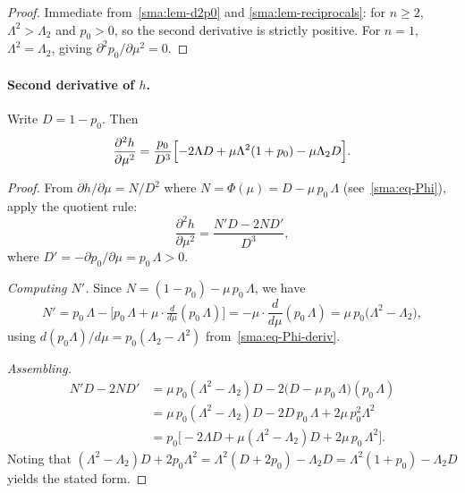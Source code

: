 \begin{proof}
  Immediate from~\cref{sma:lem-d2p0} and
  \cref{sma:lem-reciprocals}: for $n \ge 2$,
  $\Lambda^2 > \Lambda_2$ and $p_0 > 0$, so the second derivative is
  strictly positive. For $n = 1$, $\Lambda^2 = \Lambda_2$, giving
  $\partial^2 p_0/\partial\mu^2 = 0$.
\end{proof}


\paragraph{Second derivative of $h$.}

\begin{proposition}\label{sma:prop-d2h}
  Write $D = 1 - p_0$. Then
  \begin{equation}\label{sma:eq-d2h}
    \frac{\partial^2 h}{\partial\mu^2}
    = \frac{p_0}{D^3}
      \Bigl[-2\Lambda D
            + \mu\Lambda^2(1+p_0)
            - \mu\Lambda_2 D\Bigr].
  \end{equation}
\end{proposition}

\begin{proof}
  From $\partial h/\partial\mu = N/D^2$ where
  $N = \Phi(\mu) = D - \mu\,p_0\,\Lambda$
  (see~\eqref{sma:eq-Phi}), apply the quotient rule:
  \[
    \frac{\partial^2 h}{\partial\mu^2}
    = \frac{N'D - 2N D'}{D^3},
  \]
  where $D' = -\partial p_0/\partial\mu = p_0\,\Lambda > 0$.

  \medskip\noindent\textit{Computing $N'$.}\enspace
  Since $N = (1-p_0) - \mu\,p_0\,\Lambda$, we have
  \[
    N' = p_0\,\Lambda
         - \bigl[p_0\,\Lambda
           + \mu\cdot\tfrac{d}{d\mu}(p_0\,\Lambda)\bigr]
       = -\mu\cdot\frac{d}{d\mu}(p_0\,\Lambda)
       = \mu\,p_0\bigl(\Lambda^2 - \Lambda_2\bigr),
  \]
  using $d(p_0\Lambda)/d\mu = p_0(\Lambda_2 - \Lambda^2)$
  from~\eqref{sma:eq-Phi-deriv}.

  \medskip\noindent\textit{Assembling.}\enspace
  \begin{align*}
    N'D - 2N D'
    &= \mu\,p_0(\Lambda^2 - \Lambda_2)D
       - 2\bigl(D - \mu\,p_0\,\Lambda\bigr)(p_0\,\Lambda) \\
    &= \mu\,p_0(\Lambda^2 - \Lambda_2)D
       - 2D\,p_0\,\Lambda + 2\mu\,p_0^2\Lambda^2 \\
    &= p_0\bigl[-2\Lambda D
       + \mu(\Lambda^2 - \Lambda_2)D
       + 2\mu\,p_0\,\Lambda^2\bigr].
  \end{align*}
  Noting that
  $(\Lambda^2 - \Lambda_2)D + 2p_0\Lambda^2
  = \Lambda^2(D + 2p_0) - \Lambda_2 D
  = \Lambda^2(1 + p_0) - \Lambda_2 D$
  yields the stated form.
\end{proof}

